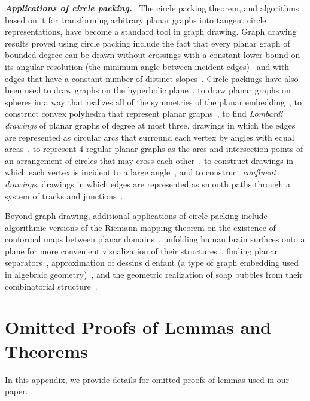 \documentclass[oribibl,10pt]{llncs}
\newcommand{\Emph}[1]{\smallskip\textbf{\textit{#1}}~}
\begin{document}
\begin{appendix}
\Emph{Applications of circle packing.}
The circle packing theorem, and algorithms based on it for transforming arbitrary planar graphs into tangent circle representations, have become a standard tool in graph drawing. Graph drawing results proved using circle packing include the fact that every planar graph of bounded degree can be drawn without crossings with a constant lower bound on its angular resolution (the minimum angle between incident edges)~ and with edges that have a constant number of distinct slopes~. Circle packings have also been used to draw graphs on the hyperbolic plane~, to draw planar graphs on spheres in a way that realizes all of the symmetries of the planar embedding~, to construct convex polyhedra that represent planar graphs~,  to find \emph{Lombardi drawings} of planar graphs of degree at most three, drawings in which the edges are represented as circular arcs that surround each vertex by angles with equal areas~, to represent 4-regular planar graphs as the arcs and intersection points of an arrangement of circles that may cross each other~, to construct drawings in which each vertex is incident to a large angle~, and to construct \emph{confluent drawings}, drawings in which edges are represented as smooth paths through a system of tracks and junctions~.

Beyond graph drawing, additional applications of circle packing include algorithmic versions of the Riemann mapping theorem on the existence of conformal maps between planar domains~, unfolding human brain surfaces onto a plane for more convenient visualization of their structures~,
finding planar separators~,
approximation of dessins d'enfant (a type of graph embedding used in algebraic geometry)~,
and the geometric realization of soap bubbles from their combinatorial structure~.

\clearpage
\section{Omitted Proofs of Lemmas and Theorems}
\label{app:proofs}
In this appendix, we provide details for omitted proofs of lemmas used in our
paper.


\end{appendix}
\end{document}
